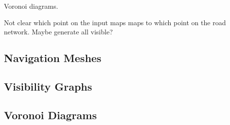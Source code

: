 Voronoi diagrams.

Not clear which point on the input maps maps to which point on the road network. Maybe generate all visible?

\subsection{Navigation Meshes}
\label{cha::lit::graphs::nav}

\subsection{Visibility Graphs}
\label{cha::lit::graphs::vis}

\subsection{Voronoi Diagrams}
\label{cha::lit::graphs::voronoi}

